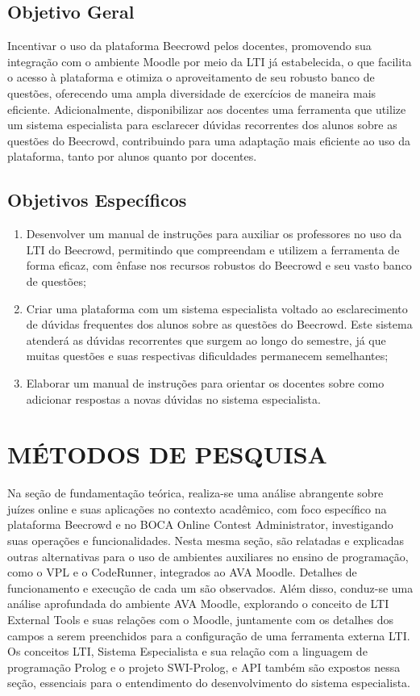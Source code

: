 \subsection{\textbf{Objetivo Geral}}

Incentivar o uso da plataforma Beecrowd pelos docentes, promovendo sua integração com o ambiente Moodle por meio da LTI já estabelecida, o que facilita o acesso à plataforma e otimiza o aproveitamento de seu robusto banco de questões, oferecendo uma ampla diversidade de exercícios de maneira mais eficiente. Adicionalmente, disponibilizar aos docentes uma ferramenta que utilize um sistema especialista para esclarecer dúvidas recorrentes dos alunos sobre as questões do Beecrowd, contribuindo para uma adaptação mais eficiente ao uso da plataforma, tanto por alunos quanto por docentes.

\subsection{\textbf{Objetivos Específicos}}

\begin{enumerate}[label=(\alph*)]
    \item  Desenvolver um manual de instruções para auxiliar os professores no uso da LTI do Beecrowd, permitindo que compreendam e utilizem a ferramenta de forma eficaz, com ênfase nos recursos robustos do Beecrowd e seu vasto banco de questões;
    \item  Criar uma plataforma com um sistema especialista voltado ao esclarecimento de dúvidas frequentes dos alunos sobre as questões do Beecrowd. Este sistema atenderá as dúvidas recorrentes que surgem ao longo do semestre, já que muitas questões e suas respectivas dificuldades permanecem semelhantes;
    \item  Elaborar um manual de instruções para orientar os docentes sobre como adicionar respostas a novas dúvidas no sistema especialista.
\end{enumerate}

\section{MÉTODOS DE PESQUISA}

Na seção de fundamentação teórica, realiza-se uma análise abrangente sobre juízes online e suas aplicações no contexto acadêmico, com foco específico na plataforma Beecrowd e no BOCA Online Contest Administrator, investigando suas operações e funcionalidades. Nesta mesma seção, são relatadas e explicadas outras alternativas para o uso de ambientes auxiliares no ensino de programação, como o VPL e o CodeRunner, integrados ao AVA Moodle. Detalhes de funcionamento e execução de cada um são observados. Além disso, conduz-se uma análise aprofundada do ambiente AVA Moodle, explorando o conceito de LTI External Tools e suas relações com o Moodle, juntamente com os detalhes dos campos a serem preenchidos para a configuração de uma ferramenta externa LTI. Os conceitos LTI, Sistema Especialista e sua relação com a linguagem de programação Prolog e o projeto SWI-Prolog, e API também são expostos nessa seção, essenciais para o entendimento do desenvolvimento do sistema especialista. 

